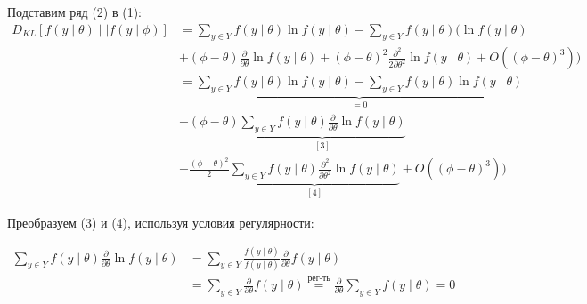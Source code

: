 \documentclass[12pt,letterpaper]{article}
\begin{document}
\begin{enumerate} [a)]
{        Подставим ряд (2) в (1):
        \begin{equation*}
            \begin{split}
                D_{KL}[f(y \mid \theta) \mid\mid f(y \mid \phi)] & = \sum\limits_{y \in Y}f(y\mid\theta)\ln{f(y\mid\theta)} - \sum\limits_{y \in Y}f(y\mid\theta)\Big(\ln{f(y \mid \theta)} \\
                & + (\phi - \theta) \frac{\partial}{\partial \theta} \ln{f(y \mid \theta)} + (\phi - \theta)^2 \frac{\partial^2}{2 \partial \theta^2}\ln{f(y \mid\theta)} + O((\phi-\theta)^3)\Big)\\
                & =\underbrace{\sum\limits_{y \in Y}f(y\mid\theta)\ln{f(y\mid\theta)} - \sum\limits_{y \in Y}f(y\mid\theta)\ln{f(y \mid \theta)}}_{= 0}\\
                & -(\phi - \theta) \underbrace{\sum\limits_{y \in Y}f(y\mid\theta)\frac{\partial}{\partial \theta} \ln{f(y \mid \theta)}}_{[3]} \\
                &- \frac{(\phi - \theta)^2}{2} \underbrace{\sum\limits_{y \in Y}f(y\mid\theta)\frac{\partial^2}{\partial \theta^2}\ln{f(y \mid\theta)}}_{[4]} + O((\phi-\theta)^3)\Big)
            \end{split}
        \end{equation*}

        Преобразуем (3) и (4), используя условия регулярности:

        \begin{equation}
            \begin{split}
                \sum\limits_{y \in Y}f(y\mid\theta)\frac{\partial}{\partial \theta} \ln{f(y \mid \theta)} & = \sum\limits_{y \in Y}\frac{f(y\mid\theta)}{f(y\mid\theta)}\frac{\partial}{\partial \theta} f(y \mid \theta) \\
                & = \sum\limits_{y \in Y}\frac{\partial}{\partial \theta} f(y \mid \theta) \overset{\text{рег-ть}}= \frac{\partial}{\partial \theta} \sum\limits_{y \in Y}f(y \mid \theta) = 0    
            \end{split}
        \end{equation}

}
\end{enumerate}
\end{document}
